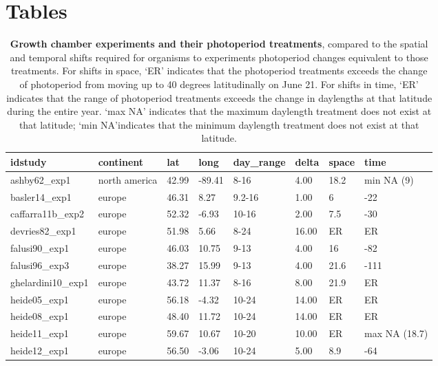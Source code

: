 \documentclass{article}
\begin{document}
\section* {Tables}
\begin{table}[ht]
\centering
\caption{\textbf{Growth chamber experiments and their photoperiod treatments}, compared to the spatial and temporal shifts required for organisms to experiments photoperiod changes equivalent to those treatments. For shifts in space, `ER' indicates that the photoperiod treatments exceeds the change of photoperiod from moving up to 40 degrees latitudinally on June 21. For shifts in time, `ER' indicates that the range of photoperiod treatments exceeds the change in daylengths at that latitude during the entire year. `max NA' indicates that the maximum daylength treatment does not exist at that latitude; `min NA'indicates that the minimum daylength treatment does not exist at that latitude.} 
\label{table:phototreats}
\begin{tabular}{|p{}|p{}|p{}|p{}|p{}|p{}|p{}|p{}|}
  \hline
idstudy & continent & lat & long & day\_range & delta & space & time \\ 
  \hline
ashby62\_exp1 & north america & 42.99 & -89.41 & 8-16 & 4.00 & 18.2 & min NA (9) \\ 
  basler14\_exp1 & europe & 46.31 & 8.27 & 9.2-16 & 1.00 & 6 & -22 \\ 
  caffarra11b\_exp2 & europe & 52.32 & -6.93 & 10-16 & 2.00 & 7.5 & -30 \\ 
  devries82\_exp1 & europe & 51.98 & 5.66 & 8-24 & 16.00 & ER & ER \\ 
  falusi90\_exp1 & europe & 46.03 & 10.75 & 9-13 & 4.00 & 16 & -82 \\ 
  falusi96\_exp3 & europe & 38.27 & 15.99 & 9-13 & 4.00 & 21.6 & -111 \\ 
  ghelardini10\_exp1 & europe & 43.72 & 11.37 & 8-16 & 8.00 & 21.9 & ER \\ 
  heide05\_exp1 & europe & 56.18 & -4.32 & 10-24 & 14.00 & ER & ER \\ 
  heide08\_exp1 & europe & 48.40 & 11.72 & 10-24 & 14.00 & ER & ER \\ 
  heide11\_exp1 & europe & 59.67 & 10.67 & 10-20 & 10.00 & ER & max NA (18.7) \\ 
  heide12\_exp1 & europe & 56.50 & -3.06 & 10-24 & 5.00 & 8.9 & -64 \\ 

\end{tabular}
\end{table}
\end{document}
